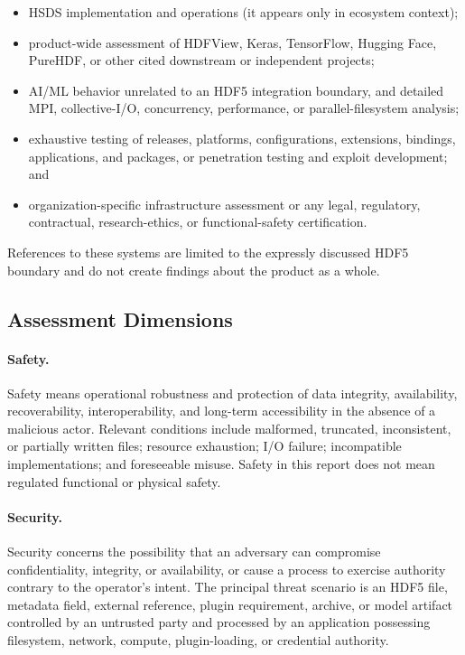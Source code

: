 \documentclass[../main.tex]{subfiles}
\begin{document}
\begin{itemize}
    \item HSDS implementation and operations (it appears only in ecosystem
          context);
    \item product-wide assessment of HDFView, Keras, TensorFlow, Hugging Face,
          PureHDF, or other cited downstream or independent projects;
    \item AI/ML behavior unrelated to an HDF5 integration boundary, and detailed
          MPI, collective-I/O, concurrency, performance, or parallel-filesystem
          analysis;
    \item exhaustive testing of releases, platforms, configurations, extensions,
          bindings, applications, and packages, or penetration testing and
          exploit development; and
    \item organization-specific infrastructure assessment or any legal,
          regulatory, contractual, research-ethics, or functional-safety
          certification.
\end{itemize}

References to these systems are limited to the expressly discussed HDF5
boundary and do not create findings about the product as a whole.

\subsection{Assessment Dimensions}
\label{sec:assessment-dimensions}

\paragraph{Safety.}
Safety means operational robustness and protection of data integrity,
availability, recoverability, interoperability, and long-term accessibility in
the absence of a malicious actor. Relevant conditions include malformed,
truncated, inconsistent, or partially written files; resource exhaustion; I/O
failure; incompatible implementations; and foreseeable misuse. Safety in this
report does not mean regulated functional or physical safety.

\paragraph{Security.}
Security concerns the possibility that an adversary can compromise
confidentiality, integrity, or availability, or cause a process to exercise
authority contrary to the operator's intent. The principal threat scenario is
an HDF5 file, metadata field, external reference, plugin requirement, archive,
or model artifact controlled by an untrusted party and processed by an
application possessing filesystem, network, compute, plugin-loading, or
credential authority.
\end{document}
